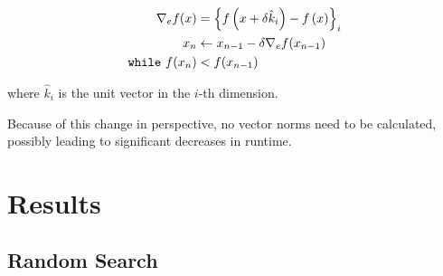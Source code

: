 \documentclass{article}
\begin{document}
            \begin{align}
                \label{eq:empirical_gradient} \nabla_e f(x) &= \left\{f\left(x + \delta \hat{k}_i\right) - f\left(x\right)\right\}_i \\
                \label{empirical_descent} x_{n} &\leftarrow x_{n-1} - \delta \nabla_e f(x_{n-1}) \\
                \label{eq:empirical_while} \text{\texttt{while} } f(x_{n}) &< f(x_{n-1})
            \end{align}

            where $\hat{k}_i$ is the unit vector in the $i$-th dimension.

            Because of this change in perspective, no vector norms need to be calculated, possibly leading to significant decreases in runtime.

\pagebreak
    \section{Results}

        \subsection{Random Search}
\end{document}
